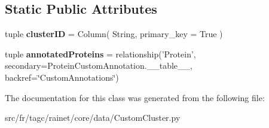 \subsection*{Static Public Attributes}
\begin{DoxyCompactItemize}
\item 
\hypertarget{classsrc_1_1fr_1_1tagc_1_1rainet_1_1core_1_1data_1_1CustomCluster_1_1CustomCluster_ab59a52793c1e4b8080db2a0d2e094dd0}{tuple {\bfseries cluster\-I\-D} = Column( String, primary\-\_\-key = True )}\label{classsrc_1_1fr_1_1tagc_1_1rainet_1_1core_1_1data_1_1CustomCluster_1_1CustomCluster_ab59a52793c1e4b8080db2a0d2e094dd0}

\item 
\hypertarget{classsrc_1_1fr_1_1tagc_1_1rainet_1_1core_1_1data_1_1CustomCluster_1_1CustomCluster_add6b3e26c61496de9cadfa292346ce86}{tuple {\bfseries annotated\-Proteins} = relationship('Protein', secondary=Protein\-Custom\-Annotation.\-\_\-\-\_\-table\-\_\-\-\_\-, backref=\char`\"{}Custom\-Annotations\char`\"{})}\label{classsrc_1_1fr_1_1tagc_1_1rainet_1_1core_1_1data_1_1CustomCluster_1_1CustomCluster_add6b3e26c61496de9cadfa292346ce86}

\end{DoxyCompactItemize}


The documentation for this class was generated from the following file\-:\begin{DoxyCompactItemize}
\item 
src/fr/tagc/rainet/core/data/Custom\-Cluster.\-py\end{DoxyCompactItemize}
